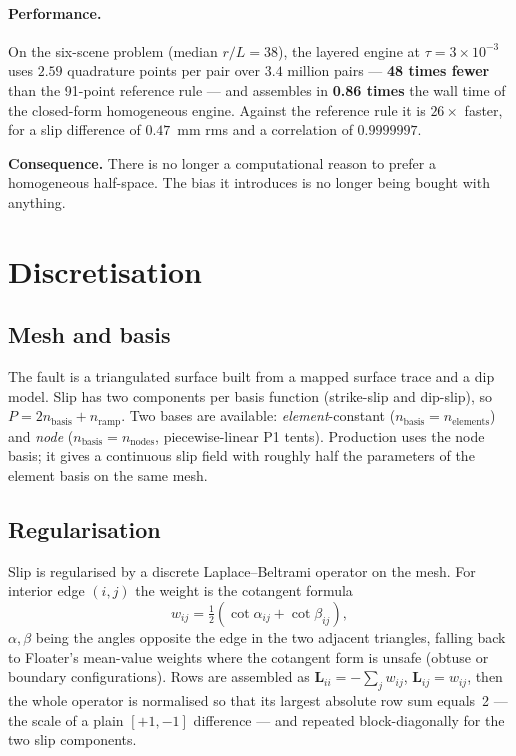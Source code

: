 \documentclass[11pt,a4paper]{article}
\newcommand{\Lop}{\mathbf{L}}
\begin{document}
\paragraph{Performance.} On the six-scene problem (median $r/L = 38$), the
layered engine at $\tau = 3\times10^{-3}$ uses $2.59$ quadrature points per pair
over $3.4$ million pairs --- \textbf{48 times fewer} than the 91-point reference
rule --- and assembles in \textbf{0.86 times} the wall time of the closed-form
homogeneous engine. Against the reference rule it is $26\times$ faster, for a
slip difference of $0.47$~mm rms and a correlation of $0.9999997$.

\medskip
\noindent\textbf{Consequence.} There is no longer a computational reason to
prefer a homogeneous half-space. The bias it introduces is no longer being
bought with anything.

\section{Discretisation}

\subsection{Mesh and basis}

The fault is a triangulated surface built from a mapped surface trace and a dip
model. Slip has two components per basis function (strike-slip and dip-slip), so
$P = 2 n_{\text{basis}} + n_{\text{ramp}}$. Two bases are available:
\emph{element}-constant ($n_{\text{basis}} = n_{\text{elements}}$) and
\emph{node} ($n_{\text{basis}} = n_{\text{nodes}}$, piecewise-linear P1 tents).
Production uses the node basis; it gives a continuous slip field with roughly
half the parameters of the element basis on the same mesh.

\subsection{Regularisation}

Slip is regularised by a discrete Laplace--Beltrami operator on the mesh. For
interior edge $(i,j)$ the weight is the cotangent formula
\begin{equation}
w_{ij} = \tfrac{1}{2}\!\left(\cot\alpha_{ij} + \cot\beta_{ij}\right),
\end{equation}
$\alpha,\beta$ being the angles opposite the edge in the two adjacent triangles,
falling back to Floater's mean-value weights where the cotangent form is unsafe
(obtuse or boundary configurations). Rows are assembled as
$\Lop_{ii} = -\sum_{j} w_{ij}$, $\Lop_{ij} = w_{ij}$, then the whole operator is
normalised so that its largest absolute row sum equals~2 --- the scale of a plain
$[+1,-1]$ difference --- and repeated block-diagonally for the two slip
components.
\end{document}
